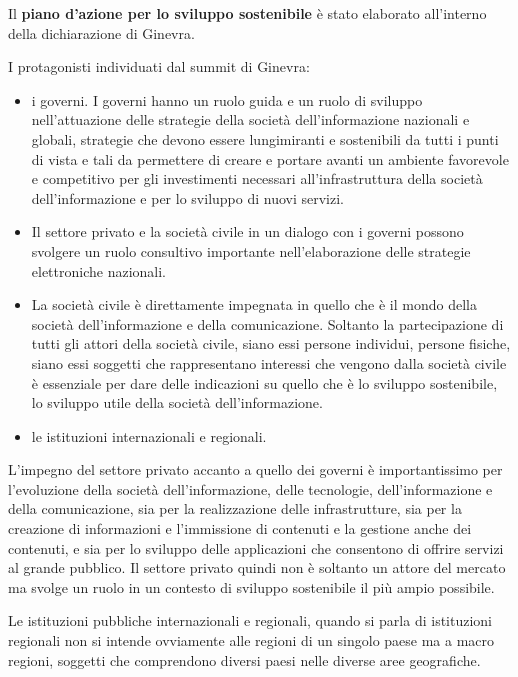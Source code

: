 Il \textbf{piano d'azione per lo sviluppo sostenibile} è stato elaborato all'interno della dichiarazione di Ginevra. \par

I protagonisti individuati dal summit di Ginevra:
\begin{itemize}
    \item i governi. I governi hanno un ruolo guida e un ruolo di sviluppo nell'attuazione delle strategie della società dell'informazione nazionali e globali, strategie che devono essere lungimiranti e sostenibili da tutti i punti di vista e tali da permettere di creare e portare avanti un ambiente favorevole e competitivo per gli investimenti necessari all'infrastruttura della società dell'informazione e per lo sviluppo di nuovi servizi.
    
    \item Il settore privato e la società civile in un dialogo con i governi possono svolgere un ruolo consultivo importante nell'elaborazione delle strategie elettroniche nazionali.
    
    \item La società civile è direttamente impegnata in quello che è il mondo della società dell'informazione e della comunicazione. Soltanto la partecipazione di tutti gli attori della società civile, siano essi persone individui, persone fisiche, siano essi soggetti che rappresentano interessi che vengono dalla società civile è essenziale per dare delle indicazioni su quello che è lo sviluppo sostenibile, lo sviluppo utile della società dell'informazione.
    
    \item le istituzioni internazionali e regionali.
\end{itemize}

L'impegno del settore privato accanto a quello dei governi è importantissimo per l'evoluzione della società dell'informazione, delle tecnologie, dell'informazione e della comunicazione, sia per la realizzazione delle infrastrutture, sia per la creazione di informazioni e l'immissione di contenuti e la gestione anche dei contenuti, e sia per lo sviluppo delle applicazioni che consentono di offrire servizi al grande pubblico. Il settore privato quindi non è soltanto un attore del mercato ma svolge un ruolo in un contesto di sviluppo sostenibile il più ampio possibile.

Le istituzioni pubbliche internazionali e regionali, quando si parla di istituzioni regionali non si intende ovviamente alle regioni di un singolo paese ma a macro regioni, soggetti che comprendono diversi paesi nelle diverse aree geografiche.

